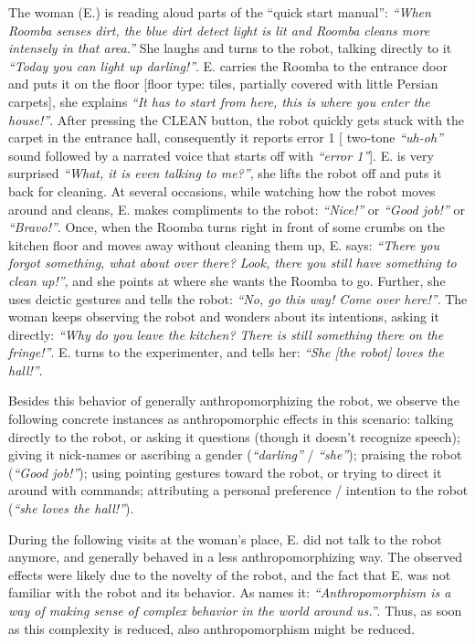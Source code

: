 \documentclass{frontiersSCNS} %
\begin{document}
The woman (E.) is reading aloud parts of the ``quick start manual'': \emph{``When
Roomba senses dirt, the blue dirt detect light is lit and Roomba cleans more
intensely in that area.''} She laughs and turns to the robot, talking directly to
it \emph{``Today you can light up darling!''}. E. carries the Roomba to the entrance
door and puts it on the floor [floor type: tiles, partially covered with little
Persian carpets], she explains \emph{``It has to start from here, this is where
you enter the house!''}. After pressing the CLEAN button, the robot quickly gets
stuck with the carpet in the entrance hall, consequently it reports error 1 [
two-tone \textit{``uh-oh''} sound followed by a narrated voice that starts off with \textit{``error
1''}]. E. is very surprised \emph{``What, it is even talking to me?''}, she lifts the
robot off and puts it back for cleaning. At several occasions, while watching
how the robot moves around and cleans, E. makes compliments to the robot:
\emph{``Nice!''} or \emph{``Good job!''} or \emph{``Bravo!''}. Once, when the Roomba turns
right in front of some crumbs on the kitchen floor and moves away without
cleaning them up, E. says: \emph{``There you forgot something, what about over
there? Look, there you still have something to clean up!''}, and she points at
where she wants the Roomba to go. Further, she uses deictic gestures and tells the
robot: \emph{``No, go this way! Come over here!''}. The woman keeps observing the
robot and wonders about its intentions, asking it directly: \emph{``Why do you
leave the kitchen? There is still something there on the fringe!''}. E. turns to
the experimenter, and tells her: \emph{``She [the robot] loves the hall!''}.

Besides this behavior of generally anthropomorphizing the robot, we observe the
following concrete instances as anthropomorphic effects in this scenario:
talking directly to the robot, or asking it questions (though it doesn't
recognize speech); giving it nick-names or ascribing a gender (\emph{``darling''}
/ \emph{``she''}); praising the robot (\emph{``Good job!''}); using pointing
gestures toward the robot, or trying to direct it around with commands; attributing
a personal preference / intention to the robot (\emph{``she loves the hall!''}).

During the following visits at the woman's place, E. did not talk to the robot
anymore, and generally behaved in a less anthropomorphizing way. The observed
effects were likely due to the novelty of the robot, and the fact that E. was not familiar with the robot and its behavior.
As \cite{persson_anthropomorphism_2000} names it: \textit{``Anthropomorphism is a way of making sense of complex behavior in the world around us.''}. Thus, as soon as this complexity is reduced, also anthropomorphism might be reduced.
 
\end{document}
